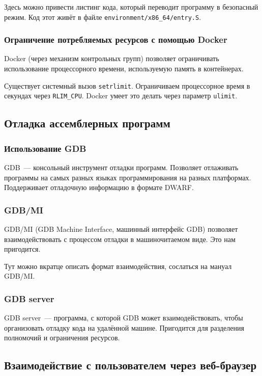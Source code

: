 \documentclass[a4paper,article,14pt]{extarticle}
\begin{document}
Здесь можно привести листинг кода, который переводит программу в безопасный режим. Код этот живёт в файле \texttt{environment/x86\_64/entry.S}.

\subsubsection{Ограничение потребляемых ресурсов с помощью Docker}

Docker (через механизм контрольных групп) позволяет ограничивать использование процессорного времени, используемую память в контейнерах.

Существует системный вызов \texttt{setrlimit}. Ограничиваем процессорное время в секундах через \texttt{RLIM\_CPU}. Docker умеет это делать через параметр \texttt{ulimit}.

\subsection{Отладка ассемблерных программ}

\subsubsection{Использование GDB}

GDB~--- консольный инструмент отладки программ. Позволяет отлаживать программы на самых разных языках программирования на разных платформах. Поддерживает отладочную информацию в формате DWARF.

\subsubsection{GDB/MI}

GDB/MI (GDB Machine Interface, машинный интерфейс GDB) позволяет взаимодействовать с процессом отладки в машиночитаемом виде. Это нам пригодится.

Тут можно вкратце описать формат взаимодействия, сослаться на мануал GDB/MI.

\subsubsection{GDB server}

GDB server~--- программа, с которой GDB может взаимодействовать, чтобы организовать отладку кода на удалённой машине. Пригодится для разделения полномочий и ограничения ресурсов.

\subsection{Взаимодействие с пользователем через веб-браузер}
\end{document}

